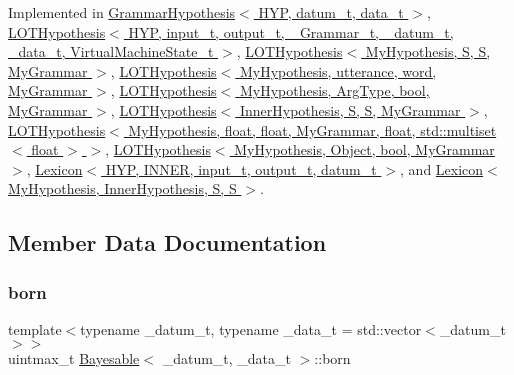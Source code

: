 Implemented in \hyperlink{class_grammar_hypothesis_a55ee98de75a30cea35fdaf62ccf14a90}{Grammar\+Hypothesis$<$ H\+Y\+P, datum\+\_\+t, data\+\_\+t $>$}, \hyperlink{class_l_o_t_hypothesis_acda322aef217a0d358ae6cea19969904}{L\+O\+T\+Hypothesis$<$ H\+Y\+P, input\+\_\+t, output\+\_\+t, \+\_\+\+Grammar\+\_\+t, \+\_\+datum\+\_\+t, \+\_\+data\+\_\+t, Virtual\+Machine\+State\+\_\+t $>$}, \hyperlink{class_l_o_t_hypothesis_acda322aef217a0d358ae6cea19969904}{L\+O\+T\+Hypothesis$<$ My\+Hypothesis, S, S, My\+Grammar $>$}, \hyperlink{class_l_o_t_hypothesis_acda322aef217a0d358ae6cea19969904}{L\+O\+T\+Hypothesis$<$ My\+Hypothesis, utterance, word, My\+Grammar $>$}, \hyperlink{class_l_o_t_hypothesis_acda322aef217a0d358ae6cea19969904}{L\+O\+T\+Hypothesis$<$ My\+Hypothesis, Arg\+Type, bool, My\+Grammar $>$}, \hyperlink{class_l_o_t_hypothesis_acda322aef217a0d358ae6cea19969904}{L\+O\+T\+Hypothesis$<$ Inner\+Hypothesis, S, S, My\+Grammar $>$}, \hyperlink{class_l_o_t_hypothesis_acda322aef217a0d358ae6cea19969904}{L\+O\+T\+Hypothesis$<$ My\+Hypothesis, float, float, My\+Grammar, float, std\+::multiset$<$ float $>$ $>$}, \hyperlink{class_l_o_t_hypothesis_acda322aef217a0d358ae6cea19969904}{L\+O\+T\+Hypothesis$<$ My\+Hypothesis, Object, bool, My\+Grammar $>$}, \hyperlink{class_lexicon_a5c584d2885a21542082332a26eb0961b}{Lexicon$<$ H\+Y\+P, I\+N\+N\+E\+R, input\+\_\+t, output\+\_\+t, datum\+\_\+t $>$}, and \hyperlink{class_lexicon_a5c584d2885a21542082332a26eb0961b}{Lexicon$<$ My\+Hypothesis, Inner\+Hypothesis, S, S $>$}.



\subsection{Member Data Documentation}
\mbox{\label{class_bayesable_a898e03a20e1851c868b77ef4e844f0bf}} 
\subsubsection{\texorpdfstring{born}{born}}
{\footnotesize\ttfamily template$<$typename \+\_\+datum\+\_\+t, typename \+\_\+data\+\_\+t = std\+::vector$<$\+\_\+datum\+\_\+t$>$$>$ \\
uintmax\+\_\+t \hyperlink{class_bayesable}{Bayesable}$<$ \+\_\+datum\+\_\+t, \+\_\+data\+\_\+t $>$\+::born}

\mbox{\label{class_bayesable_a4d1a9ed826013bf079cea1867b6d4183}} 
